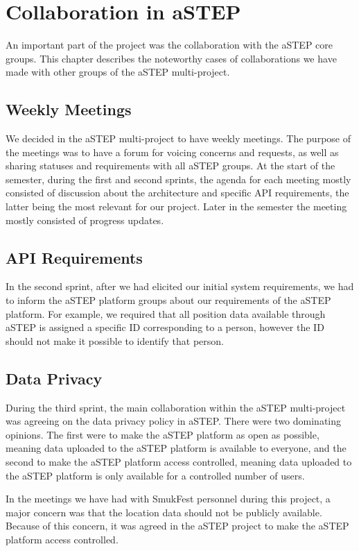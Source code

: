 \chapter{Collaboration in aSTEP}\label{ch:collab}

An important part of the project was the collaboration with the aSTEP core groups. This chapter describes the noteworthy cases of collaborations we have made with other groups of the aSTEP multi-project.

\section{Weekly Meetings}
We decided in the aSTEP multi-project to have weekly meetings. The purpose of the meetings was to have a forum for voicing concerns and requests, as well as sharing statuses and requirements with all aSTEP groups. At the start of the semester, during the first and second sprints, the agenda for each meeting mostly consisted of discussion about the architecture and specific API requirements, the latter being the most relevant for our project. Later in the semester the meeting mostly consisted of progress updates.

\section{API Requirements}
In the second sprint, after we had elicited our initial system requirements, we had to inform the aSTEP platform groups about our requirements of the aSTEP platform. For example, we required that all position data available through aSTEP is assigned a specific ID corresponding to a person, however the ID should not make it possible to identify that person.

\section{Data Privacy}
During the third sprint, the main collaboration within the aSTEP multi-project was agreeing on the data privacy policy in aSTEP. There were two dominating opinions. The first were to make the aSTEP platform as open as possible, meaning data uploaded to the aSTEP platform is available to everyone, and the second to make the aSTEP platform access controlled, meaning data uploaded to the aSTEP platform is only available for a controlled number of users.

In the meetings we have had with SmukFest personnel during this project, a major concern was that the location data should not be publicly available. Because of this concern, it was agreed in the aSTEP project to make the aSTEP platform access controlled.

